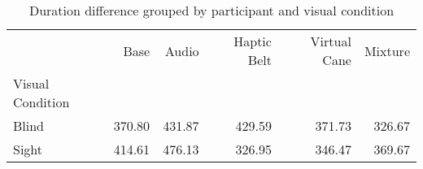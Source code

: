 
\begin{table}[!htb]
\centering
\caption{Duration difference grouped by participant and visual condition}
\label{tab:duracao_average_group}
\begin{tabular}{lrrrrr}
\toprule
{} &    Base &   Audio & Haptic Belt & Virtual Cane & Mixture \\
Visual Condition &         &         &             &              &         \\
\midrule
Blind            &  370.80 &  431.87 &      429.59 &       371.73 &  326.67 \\
Sight            &  414.61 &  476.13 &      326.95 &       346.47 &  369.67 \\
\bottomrule
\end{tabular}
\end{table}

